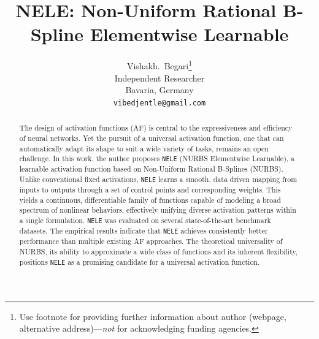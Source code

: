 \documentclass{article}
\title{NELE: Non-Uniform Rational B-Spline Elementwise Learnable}
\author{%
  Vishakh.~Begari\thanks{Use footnote for providing further information
    about author (webpage, alternative address)---\emph{not} for acknowledging
    funding agencies.} \\
  Independent Researcher\\
  Bavaria, Germany \\
  \texttt{vibedjentle@gmail.com} \\
}
\begin{document}
\maketitle


\begin{abstract}
  The design of activation functions (AF) 
    is central to the expressiveness and efficiency of neural networks. 
    Yet the pursuit of a universal activation function, one that can 
    automatically adapt its shape to suit a wide variety of tasks, remains 
    an open challenge. In this work, the author proposes \texttt{NELE} (NURBS Elementwise Learnable), 
    a learnable activation function based on Non-Uniform Rational B-Splines (NURBS).
    Unlike conventional fixed activations, \texttt{NELE} 
    learns a smooth, data driven mapping from inputs to outputs 
    through a set of control points and corresponding weights.
    This yields a continuous, differentiable family of functions capable 
    of modeling a broad spectrum of nonlinear behaviors, effectively 
    unifying diverse activation patterns within a single formulation.
    \texttt{NELE} was evaluated on several state-of-the-art benchmark datasets.
    The empirical results indicate that \texttt{NELE} achieves consistently better performance 
    than multiple existing AF approaches. The theoretical universality of NURBS, its ability to approximate a wide class 
    of functions and its inherent flexibility, positions \texttt{NELE} as a promising candidate 
    for a universal activation function.

\end{abstract}
\end{document}
